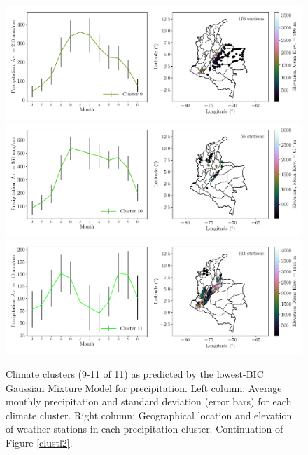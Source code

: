 \documentclass[a4paper,fleqn,usenatbib]{mnras}
\begin{document}
\begin{figure}
\begin{center}


\includegraphics[scale=0.5,trim={0 17 0 18},clip]{gmml8.pdf}
\includegraphics[scale=0.5,trim={0 17 0 18},clip]{gmml9.pdf}
\includegraphics[scale=0.5,trim={0 17 0 18},clip]{gmml10.pdf}
\caption{Climate clusters (9-11 of 11) as predicted by the lowest-BIC Gaussian Mixture Model for precipitation. Left column: Average monthly precipitation and standard deviation (error bars) for each climate cluster. Right column: Geographical location and elevation of weather stations in each precipitation cluster. Continuation of Figure \ref{clustl2}.}\label{clustl3}
\end{center}
\end{figure}
\end{document}
